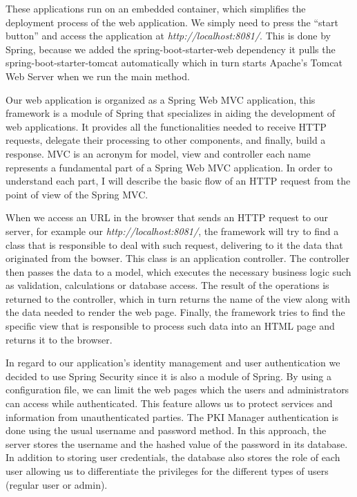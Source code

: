 These applications run on an embedded container, which simplifies the deployment process of the web application. We simply need to press the “start button” and access the application at \textit{http://localhost:8081/}. This is done by Spring, because we added the spring-boot-starter-web dependency it pulls the spring-boot-starter-tomcat automatically which in turn starts Apache’s Tomcat Web Server when we run the main method.

Our web application is organized as a Spring Web MVC application, this framework is a module of Spring that specializes in aiding the development of web applications. It provides all the functionalities needed to receive HTTP requests, delegate their processing to other components, and finally, build a response. MVC is an acronym for model, view and controller each name represents a fundamental part of a Spring Web MVC application. In order to understand each part, I will describe the basic flow of an HTTP request from the point of view of the Spring MVC.

When we access an URL in the browser that sends an HTTP request to our server, for example our \textit{http://localhost:8081/}, the framework will try to find a class that is responsible to deal with such request, delivering to it the data that originated from the bowser. This class is an application controller. The controller then passes the data to a model, which executes the necessary business logic such as validation, calculations or database access. The result of the operations is returned to the controller, which in turn returns the name of the view along with the data needed to render the web page. Finally, the framework tries to find the specific view that is responsible to process such data into an HTML page and returns it to the browser. 

In regard to our application's identity management and user authentication we decided to use Spring Security since it is also a module of Spring. By using a configuration file, we can limit the web pages which the users and administrators can access while authenticated. This feature allows us to protect services and information from unauthenticated parties. The PKI Manager authentication is done using the usual username and password method. In this approach, the server stores the username and the hashed value of the password in its database. In addition to storing user credentials, the database also stores the role of each user allowing us to differentiate the privileges for the different types of users (regular user or admin). 

